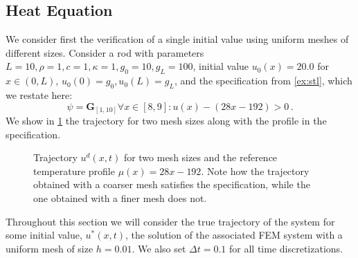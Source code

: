 \documentclass[letterpaper, 10 pt, conference]{ieeeconf/ieeeconf}
\newcommand{\Always}{\mathbf{G}}
\begin{document}
\subsection{Heat Equation}
\label{sub:heat_equation}

We consider first the verification of a single initial value using uniform
meshes of different sizes. Consider a rod with parameters $L = 10, \rho = 1, c =
1, \kappa = 1, g_0 = 10, g_L = 100$, initial value $u_0(x) = 20.0$
for $x \in (0, L)$, $u_0(0) = g_0, u_0(L) = g_L$, and the specification from
\cref{ex:stl}, which we restate here:
%
\begin{equation}
    \psi = \Always_{[1,10]} \forall x \in [8,9] : u(x) - (28x - 192) > 0 \,.
\end{equation}
%
We show in \cref{fig:ex1_evolution} the trajectory for two mesh sizes along with the
profile in the specification.

\begin{figure}[!t]
    \centering 
        \hfill
        \hfill
    \caption{Trajectory $u^d(x, t)$ for two mesh sizes and the reference
        temperature profile $\mu(x) = 28x - 192$. Note how the trajectory
        obtained with a coarser mesh satisfies the specification, while the one
        obtained with a finer mesh does not.}
    \label{fig:ex1_evolution}
\end{figure}


Throughout this
section we will consider the true trajectory of the system for some initial
value, $u^*(x, t)$, the solution of the associated FEM system with a uniform mesh of
size $h = 0.01$. We also set $\Delta t = 0.1$ for all time discretizations.
\end{document}
